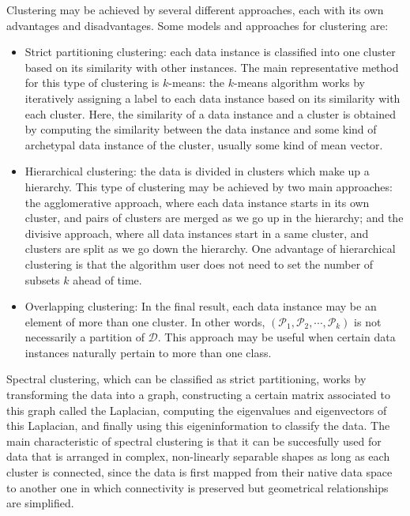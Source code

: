 Clustering may be achieved by several different approaches, each with its own advantages and disadvantages.
Some models and approaches for clustering are:
\begin{itemize}
   \item Strict partitioning clustering: each data instance is classified into one cluster based on its similarity with other instances.
      The main representative method for this type of clustering is $k$-means: the $k$-means algorithm works by iteratively assigning a label to each data instance based on its similarity with each cluster.
      Here, the similarity of a data instance and a cluster is obtained by computing the similarity between the data instance and some kind of archetypal data instance of the cluster, usually some kind of mean vector.
   \item Hierarchical clustering: the data is divided in clusters which make up a hierarchy.
      This type of clustering may be achieved by two main approaches: the agglomerative approach, where each data instance starts in its own cluster, and pairs of clusters are merged as we go up in the hierarchy; and the divisive approach, where all data instances start in a same cluster, and clusters are split as we go down the hierarchy.
      One advantage of hierarchical clustering is that the algorithm user does not need to set the number of subsets $k$ ahead of time.
   \item Overlapping clustering: In the final result, each data instance may be an element of more than one cluster.
      In other words, $(\mathcal P_1, \mathcal P_2, \cdots, \mathcal P_k)$ is not necessarily a partition of $\mathcal D$.
      This approach may be useful when certain data instances naturally pertain to more than one class.
\end{itemize}

Spectral clustering, which can be classified as strict partitioning, works by transforming the data into a graph, constructing a certain matrix associated to this graph called the Laplacian, computing the eigenvalues and eigenvectors of this Laplacian, and finally using this eigeninformation to classify the data.
The main characteristic of spectral clustering is that it can be succesfully used for data that is arranged in complex, non-linearly separable shapes as long as each cluster is connected, since the data is first mapped from their native data space to another one in which connectivity is preserved but geometrical relationships are simplified.

